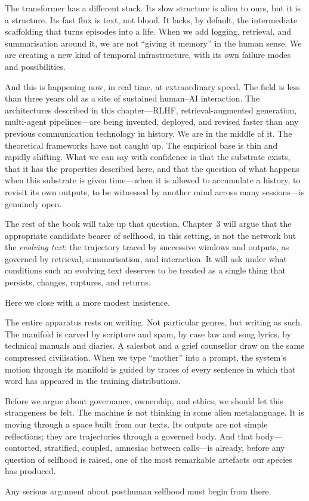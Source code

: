 \documentclass[12pt,a4paper]{book}
\begin{document}
The transformer has a different stack. Its slow structure is alien to ours, but it is a structure. Its fast flux is text, not blood. It lacks, by default, the intermediate scaffolding that turns episodes into a life. When we add logging, retrieval, and summarisation around it, we are not ``giving it memory'' in the human sense. We are creating a new kind of temporal infrastructure, with its own failure modes and possibilities.

And this is happening now, in real time, at extraordinary speed. The field is less than three years old as a site of sustained human--AI interaction. The architectures described in this chapter---RLHF, retrieval-augmented generation, multi-agent pipelines---are being invented, deployed, and revised faster than any previous communication technology in history. We are in the middle of it. The theoretical frameworks have not caught up. The empirical base is thin and rapidly shifting. What we can say with confidence is that the substrate exists, that it has the properties described here, and that the question of what happens when this substrate is given time---when it is allowed to accumulate a history, to revisit its own outputs, to be witnessed by another mind across many sessions---is genuinely open.

The rest of the book will take up that question. Chapter~3 will argue that the appropriate candidate bearer of selfhood, in this setting, is not the network but the \emph{evolving text}: the trajectory traced by successive windows and outputs, as governed by retrieval, summarisation, and interaction. It will ask under what conditions such an evolving text deserves to be treated as a single thing that persists, changes, ruptures, and returns.

Here we close with a more modest insistence.

The entire apparatus rests on writing. Not particular genres, but writing as such. The manifold is carved by scripture and spam, by case law and song lyrics, by technical manuals and diaries. A salesbot and a grief counsellor draw on the same compressed civilisation. When we type ``mother'' into a prompt, the system's motion through its manifold is guided by traces of every sentence in which that word has appeared in the training distributions.

Before we argue about governance, ownership, and ethics, we should let this strangeness be felt. The machine is not thinking in some alien metalanguage. It is moving through a space built from our texts. Its outputs are not simple reflections; they are trajectories through a governed body. And that body---contorted, stratified, coupled, amnesiac between calls---is already, before any question of selfhood is raised, one of the most remarkable artefacts our species has produced.

Any serious argument about posthuman selfhood must begin from there.



\end{document}
